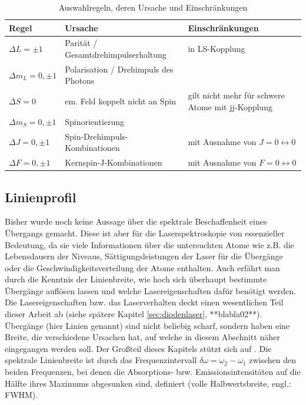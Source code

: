 \begin{table}
	\begin{tabular}{p{}p{}p{}}
		\toprule
		Regel & Ursache & Einschränkungen \\
		\midrule[1px]
		\hline
		$\Delta L = \pm1$ & Parität / Gesamtdrehimpulserhaltung & in LS-Kopplung \\
		$\Delta m_L = 0, \pm1$ & Polarisation / Drehimpuls des Photons & \\
		$\Delta S = 0$ & em. Feld koppelt nicht an Spin & gilt nicht mehr für schwere
		Atome mit jj-Kopplung \\
		$\Delta m_S = 0, \pm1$ & Spinorientierung & \\
		$\Delta J = 0, \pm1$ & Spin-Drehimpuls-Kombinationen & mit Ausnahme von
		$J=0\leftrightarrow0$
		\\
		$\Delta F = 0, \pm1$ & Kernspin-J-Kombinationen & mit Ausnahme von
		$F=0\leftrightarrow0$
		\\
		\bottomrule[1px]
	\end{tabular}
	\caption{Auswahlregeln, deren Ursache und Einschränkungen}
	\label{tab:auswahlregeln}
\end{table}



\subsection{Linienprofil}\label{sec:linienprofil}
Bisher wurde noch keine Aussage über die spektrale Beschaffenheit eines
Übergangs gemacht. Diese ist aber für die Laserspektroskopie von essenzieller
Bedeutung, da sie viele Informationen über die untersuchten Atome wie z.B. die
Lebensdauern der Niveaus, Sättigungsleistungen der Laser für die Übergänge oder
die Geschwindigkeitsverteilung der Atome enthalten. Auch erfährt man durch die
Kenntnis der Linienbreite, wie hoch sich überhaupt bestimmte Übergänge auflösen
lassen und welche Lasereigenschaften dafür benötigt werden. Die
Lasereigenschaften bzw. das Laserverhalten deckt einen wesentlichen Teil
dieser Arbeit ab (siehe spätere Kapitel \ref{sec:diodenlaser}, **blabla02**).
Übergänge (hier Linien genannt) sind nicht beliebig scharf, sondern haben eine Breite, die verschiedene Ursachen hat, auf welche in diesem Abschnitt näher eingegangen werden soll. Der Großteil dieses Kapitels stützt sich auf \cite{demtroeder:laserspektroskopie}. Die spektrale Linienbreite ist durch das Frequenzintervall $\delta\omega=\omega_2-\omega_1$ zwischen den beiden
Frequenzen, bei denen die Absorptions- bzw. Emissionsintensitäten auf die Hälfte
ihres Maximums abgesunken sind, definiert (volle Halbwertsbreite, engl.:
FWHM).

